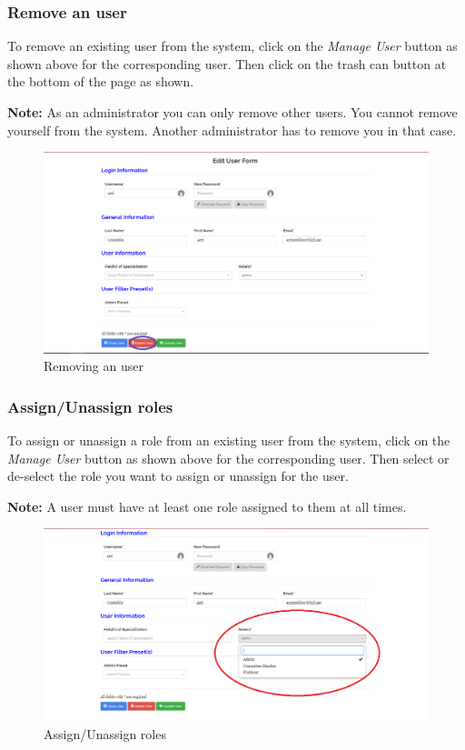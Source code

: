 \documentclass[fontsize=12pt,paper=letter,twoside]{scrartcl}
\begin{document}
\subsubsection{Remove an user}
To remove an existing user from the system, click on the \emph{Manage User} button as shown above for the corresponding user. Then click on the trash can button at the bottom of the page as shown.

\smallskip
\noindent \textbf{Note:} As an administrator you can only remove other users. You cannot remove yourself from the system. Another administrator has to remove you in that case.

\begin{figure}[!htb]
\begin{center}
\includegraphics[width=.99\textwidth]{images/adm/mu/remove_user.png}
\end{center}
\caption{Removing an user}
\label{fig:adm/remove_user}
\end{figure}

\clearpage
\subsubsection{Assign/Unassign roles}
To assign or unassign a role from an existing user from the system, click on the \emph{Manage User} button as shown above for the corresponding user. Then select or de-select the role you want to assign or unassign for the user.

\smallskip
\noindent \textbf{Note:} A user must have at least one role assigned to them at all times.

\begin{figure}[!htb]
\begin{center}
\includegraphics[width=.99\textwidth]{images/adm/mu/edit_roles.png}
\end{center}
\caption{Assign/Unassign roles}
\label{fig:adm/edit_roles}
\end{figure}
\end{document}
